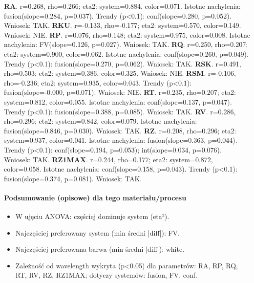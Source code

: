 \documentclass[
  10pt,
]{article}
\begin{document}
\textbf{RA}. r=0.268, rho=0.266; eta2: system=0.884, color=0.071.
Istotne nachylenia: fusion(slope=0.284, p=0.037). Trendy
(p\textless0.1): conf(slope=0.280, p=0.052). Wniosek: TAK. \textbf{RKU}.
r=-0.133, rho=-0.177; eta2: system=0.570, color=0.149. Wniosek: NIE.
\textbf{RP}. r=0.076, rho=0.148; eta2: system=0.975, color=0.008.
Istotne nachylenia: FV(slope=0.126, p=0.027). Wniosek: TAK. \textbf{RQ}.
r=0.250, rho=0.207; eta2: system=0.900, color=0.062. Istotne nachylenia:
conf(slope=0.260, p=0.049). Trendy (p\textless0.1): fusion(slope=0.270,
p=0.062). Wniosek: TAK. \textbf{RSK}. r=0.491, rho=0.503; eta2:
system=0.386, color=0.325. Wniosek: NIE. \textbf{RSM}. r=-0.106,
rho=-0.236; eta2: system=0.935, color=0.043. Trendy (p\textless0.1):
fusion(slope=-0.000, p=0.071). Wniosek: NIE. \textbf{RT}. r=0.235,
rho=0.207; eta2: system=0.812, color=0.055. Istotne nachylenia:
conf(slope=0.137, p=0.047). Trendy (p\textless0.1): fusion(slope=0.388,
p=0.085). Wniosek: TAK. \textbf{RV}. r=0.286, rho=0.296; eta2:
system=0.842, color=0.079. Istotne nachylenia: fusion(slope=0.846,
p=0.030). Wniosek: TAK. \textbf{RZ}. r=0.208, rho=0.296; eta2:
system=0.937, color=0.041. Istotne nachylenia: fusion(slope=0.363,
p=0.044). Trendy (p\textless0.1): conf(slope=0.194, p=0.053);
int(slope=0.034, p=0.076). Wniosek: TAK. \textbf{RZ1MAX}. r=0.244,
rho=0.177; eta2: system=0.872, color=0.058. Istotne nachylenia:
conf(slope=0.158, p=0.043). Trendy (p\textless0.1): fusion(slope=0.374,
p=0.081). Wniosek: TAK.

\paragraph{Podsumowanie (opisowe) dla tego materiału/procesu}
\begin{itemize}
\item W ujęciu ANOVA: częściej dominuje system (eta²).
\item Najczęściej preferowany system (min średni |diff|): FV.
\item Najczęściej preferowana barwa (min średni |diff|): white.
\item Zależność od wavelength wykryta (p<0.05) dla parametrów: RA, RP, RQ, RT, RV, RZ, RZ1MAX; dotyczy systemów: fusion, FV, conf.
\end{itemize}
\end{document}
